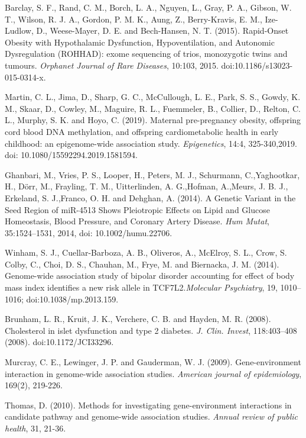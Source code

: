 \documentclass[12pt]{article}
\begin{document}
\begin{thebibliography}{99}
Barclay, S. F., Rand, C. M., Borch, L. A., Nguyen, L., Gray, P. A., Gibson, W. T., Wilson, R. J. A., Gordon, P. M. K., Aung, Z., Berry-Kravis, E. M., Ize-Ludlow, D., Weese-Mayer, D. E. and Bech-Hansen, N. T.  (2015). Rapid-Onset Obesity with Hypothalamic Dysfunction, Hypoventilation, and Autonomic Dysregulation (ROHHAD): exome sequencing of trios, monozygotic twins and tumours.  \emph{Orphanet Journal of Rare Diseases}, 10:103, 2015. doi:10.1186/s13023-015-0314-x.

Martin, C. L., Jima, D., Sharp, G. C., McCullough, L. E., Park, S. S., Gowdy, K. M., Skaar, D., Cowley, M., Maguire, R. L., Fuemmeler, B., Collier, D., Relton, C. L., Murphy, S. K. and Hoyo, C.  (2019). Maternal pre-pregnancy obesity, offspring cord blood DNA methylation, and offspring cardiometabolic health in early childhood: an epigenome-wide association study. \emph{Epigenetics}, 14:4, 325-340,2019. doi: 10.1080/15592294.2019.1581594.

Ghanbari, M., Vries, P. S., Looper, H., Peters, M. J., Schurmann, C.,Yaghootkar, H., D\"{o}rr, M., Frayling, T. M., Uitterlinden, A. G.,Hofman, A.,Meurs, J. B. J., Erkeland, S. J.,Franco, O. H. and Dehghan, A.  (2014). A Genetic Variant in the Seed Region of miR-4513 Shows Pleiotropic Effects on Lipid and Glucose Homeostasis, Blood Pressure, and Coronary Artery Disease. \emph{Hum Mutat}, 35:1524–1531, 2014, doi: 10.1002/humu.22706.

Winham, S. J., Cuellar-Barboza, A. B., Oliveros, A., McElroy, S. L., Crow, S. Colby, C., Choi, D. S., Chauhan, M., Frye, M. and Biernacka, J. M. (2014). Genome-wide association study of bipolar disorder accounting for effect of body mass index identifies a new risk allele in TCF7L2.\emph{Molecular Psychiatry}, 19, 1010–1016; doi:10.1038/mp.2013.159.

Brunham, L. R., Kruit, J. K., Verchere, C. B. and Hayden, M. R. (2008). Cholesterol in islet dysfunction and type 2 diabetes. \emph{J. Clin. Invest}, 118:403–408 (2008). doi:10.1172/JCI33296.

Murcray, C. E., Lewinger, J. P. and Gauderman, W. J. (2009). Gene-environment interaction in genome-wide association studies. \emph{American journal of epidemiology}, 169(2), 219-226.

Thomas, D. (2010). Methods for investigating gene-environment interactions in candidate pathway and genome-wide association studies. \emph{Annual review of public health}, 31, 21-36.


\end{thebibliography}
\end{document}
